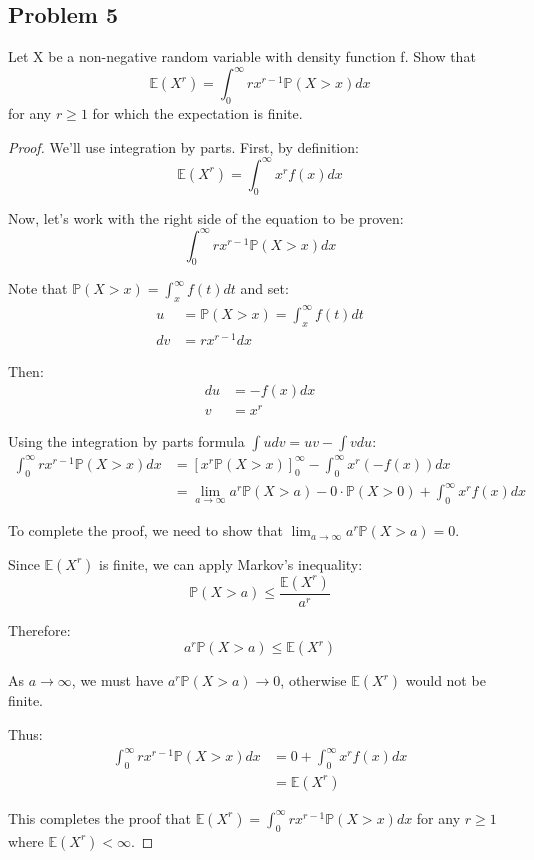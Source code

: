 \documentclass[letterpaper, 11pt]{article}
\newcommand{\1}{\mathds{1}}	%
\theoremstyle{definition}
\begin{document}
\subsection*{Problem 5}
Let X be a non-negative random variable with density function f. Show that
$$\mathbb{E}(X^r) = \int_0^\infty r x^{r-1} \mathbb{P}(X > x) dx$$
for any $r \geq 1$ for which the expectation is finite.
\begin{proof}
We'll use integration by parts. First, by definition:
$$\mathbb{E}(X^r) = \int_0^\infty x^r f(x) dx$$

Now, let's work with the right side of the equation to be proven:
$$\int_0^\infty r x^{r-1} \mathbb{P}(X > x) dx$$

Note that $\mathbb{P}(X > x) = \int_x^\infty f(t) dt$ and set:
\begin{align*}
u &= \mathbb{P}(X > x) = \int_x^\infty f(t) dt\\
dv &= r x^{r-1} dx
\end{align*}

Then:
\begin{align*}
du &= -f(x) dx\\
v &= x^r
\end{align*}

Using the integration by parts formula $\int u dv = uv - \int v du$:
\begin{align*}
\int_0^\infty r x^{r-1} \mathbb{P}(X > x) dx &= \left[ x^r \mathbb{P}(X > x) \right]_0^\infty - \int_0^\infty x^r (-f(x)) dx\\
&= \lim_{a \to \infty} a^r \mathbb{P}(X > a) - 0 \cdot \mathbb{P}(X > 0) + \int_0^\infty x^r f(x) dx
\end{align*}

To complete the proof, we need to show that $\lim_{a \to \infty} a^r \mathbb{P}(X > a) = 0$.

Since $\mathbb{E}(X^r)$ is finite, we can apply Markov's inequality:
$$\mathbb{P}(X > a) \leq \frac{\mathbb{E}(X^r)}{a^r}$$

Therefore:
$$a^r \mathbb{P}(X > a) \leq \mathbb{E}(X^r)$$

As $a \to \infty$, we must have $a^r \mathbb{P}(X > a) \to 0$, otherwise $\mathbb{E}(X^r)$ would not be finite.

Thus:
\begin{align*}
\int_0^\infty r x^{r-1} \mathbb{P}(X > x) dx &= 0 + \int_0^\infty x^r f(x) dx\\
&= \mathbb{E}(X^r)
\end{align*}

This completes the proof that $\mathbb{E}(X^r) = \int_0^\infty r x^{r-1} \mathbb{P}(X > x) dx$ for any $r \geq 1$ where $\mathbb{E}(X^r) < \infty$.
\end{proof}
\end{document}
